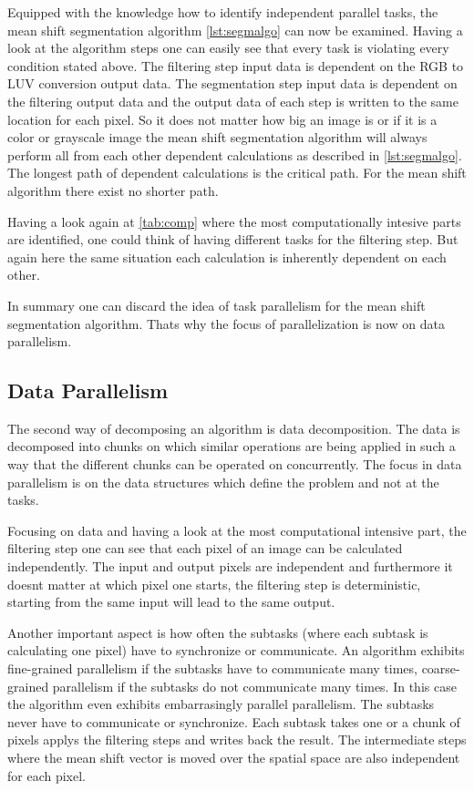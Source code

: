Equipped with the knowledge how to identify independent parallel tasks, the 
mean shift segmentation algorithm \autoref{lst:segmalgo} can now be examined. 
Having a look at the algorithm steps one can easily see that every task is 
violating every condition stated above. The filtering step input data is 
dependent on the \gls{RGB} to \gls{LUV} conversion output data. The segmentation
step input data is dependent on the filtering output data and the output data 
of each step is written to the same location for each pixel. So it does not matter
how big an image is or if it is a color or grayscale image the mean shift segmentation
algorithm will always perform all from each other dependent calculations as
described in \autoref{lst:segmalgo}. The longest path of dependent calculations
is the critical path. For the mean shift algorithm there exist no shorter path. 

Having a look again at \autoref{tab:comp} where the most computationally 
intesive parts are identified, one could think of having different tasks for the
filtering step. But again here the same situation each calculation is inherently 
dependent on each other. 

In summary one can discard the idea of task parallelism for the mean shift
segmentation algorithm. Thats why the focus of parallelization is now on data
parallelism.


\subsection{Data Parallelism} %
\label{sub:data_parallelism}
The second way of decomposing an algorithm is data decomposition. The data is
decomposed into chunks on which similar operations are being applied in such a
way that the different chunks can be operated on concurrently. The focus in data
parallelism is on the data structures which define the problem and not at the
tasks.

Focusing on data and having a look at the most computational intensive part, 
the filtering step one can see that each pixel of an image can be calculated 
independently. The input and output pixels are independent and furthermore it
doesnt matter at which pixel one starts, the filtering step is deterministic, 
starting from the same input will lead to the same output. 

Another important aspect is how often the subtasks (where each subtask is
calculating one pixel) have to synchronize or communicate. An algorithm exhibits
fine-grained parallelism if the subtasks have to communicate many times,
coarse-grained parallelism if the subtasks do not communicate many times. In
this case the algorithm even exhibits embarrasingly parallel parallelism. The
subtasks never have to communicate or synchronize. Each subtask takes one or a
chunk of pixels applys the filtering steps and writes back the result. The
intermediate steps where the mean shift vector is moved over the spatial space
are also independent for each pixel.

